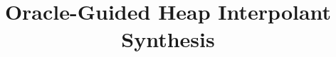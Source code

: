 \title{
 Oracle-Guided Heap Interpolant Synthesis
}

\ifdefined\DRAFT
 \pagestyle{fancyplain}
 \rhead{\thedate}
\fi

